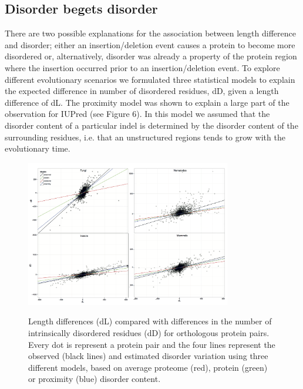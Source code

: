 \documentclass[11pt, a4paper,oneside]{report}
\begin{document}
\subsection{Disorder begets disorder}
There are two possible explanations for the association between length difference and disorder; either an insertion/deletion event causes a protein to become more disordered or, alternatively, disorder was already a property of the protein region where the insertion occurred prior to an insertion/deletion event. To explore different evolutionary scenarios we formulated three statistical models to explain the expected difference in number of disordered residues, dD, given a length difference of dL. The proximity model was shown to explain a large part of the observation for IUPred (see Figure 6). In this model we assumed that the disorder content of a particular indel is determined by the disorder content of the surrounding residues, i.e. that an unstructured regions tends to grow with the evolutionary time. 
\begin{figure}[ht]
\begin{center}
\label{img:populations}
\includegraphics[width=0.8\textwidth]{figures/lenvar.png}
\end{center}
\caption{Length differences (dL) compared with differences in the
  number of intrinsically disordered residues (dD) for orthologous
  protein pairs. Every dot is represent a protein pair and the four
  lines represent the observed (black lines) and estimated disorder
  variation using three different models, based on average proteome
  (red), protein (green) or proximity (blue) disorder content.} 
\end{figure}
\end{document}
